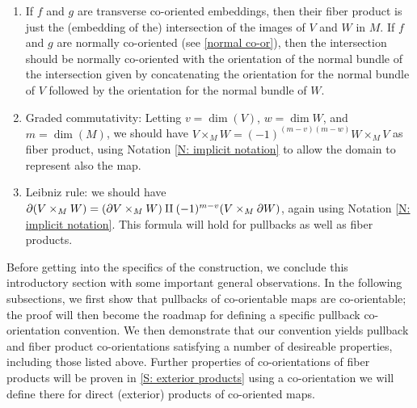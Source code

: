 \begin{enumerate}
	\item If $f$ and $g$ are transverse co-oriented embeddings, then their fiber product is just the (embedding of the) intersection of the images of $V$ and $W$ in $M$.
	If $f$ and $g$ are normally co-oriented (see \cref{normal co-or}), then the intersection should be normally co-oriented with the orientation of the normal bundle of the intersection given by concatenating the orientation for the normal bundle of $V$ followed by the orientation for the normal bundle of $W$.

	\item Graded commutativity: Letting $v = \dim(V)$, $w = \dim W$, and $m = \dim(M)$, we should have $V \times_M W = (-1)^{(m-v)(m-w)}W \times_M V$ as fiber product, using Notation \ref{N: implicit notation} to allow the domain to represent also the map.

	\item Leibniz rule: we should have $\partial (V \times_M W) = (\partial V \times_M W)\amalg (-1)^{m-v}(V \times_M \partial W)$, again using Notation \ref{N: implicit notation}.
	This formula will hold for pullbacks as well as fiber products.
\end{enumerate}

Before getting into the specifics of the construction, we conclude this introductory section with some important general observations.
In the following subsections, we first show that pullbacks of co-orientable maps are co-orientable; the proof will then become the roadmap for defining a specific pullback co-orientation convention.
We then demonstrate that our convention yields pullback and fiber product co-orientations satisfying a number of desireable properties, including those listed above.
Further properties of co-orientations of fiber products will be proven in \cref{S: exterior products} using a co-orientation we will define there for direct (exterior) products of co-oriented maps.

